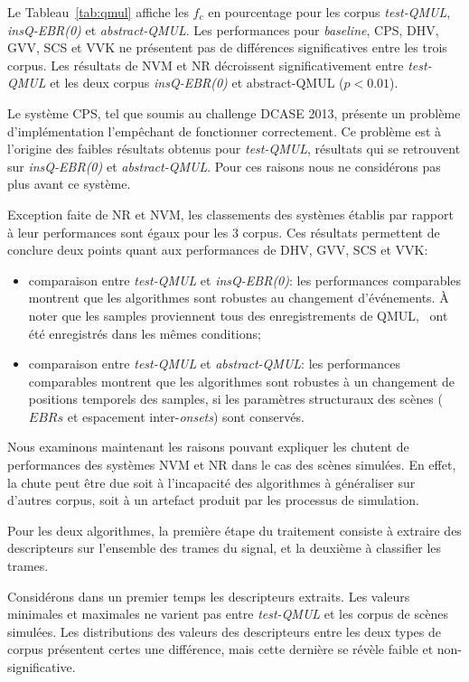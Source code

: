 Le Tableau~\ref{tab:qmul} affiche les $f_c$ en pourcentage pour les corpus \emph{test-QMUL}, \emph{insQ-EBR(0)} et \emph{abstract-QMUL}. Les performances pour \emph{baseline}, CPS, DHV, GVV, SCS et VVK ne présentent pas de différences significatives entre les trois corpus. Les résultats de NVM et NR décroissent significativement entre \emph{test-QMUL} et les deux corpus \emph{insQ-EBR(0)} et abstract-QMUL ($p<0.01$).

Le système CPS, tel que soumis au challenge DCASE 2013, présente un problème d'implémentation l'empêchant de fonctionner correctement. Ce problème est à l'origine des faibles résultats obtenus pour \emph{test-QMUL}, résultats qui se retrouvent sur \emph{insQ-EBR(0)} et \emph{abstract-QMUL}. Pour ces raisons nous ne considérons pas plus avant ce système.

Exception faite de NR et NVM, les classements des systèmes établis par rapport à leur performances sont égaux pour les 3 corpus. Ces résultats permettent de conclure deux points quant aux performances de DHV, GVV, SCS et VVK:

\begin{itemize}
\item comparaison entre \emph{test-QMUL} et \emph{insQ-EBR(0)}: les performances comparables montrent que les algorithmes sont robustes au changement d'événements. À noter que les samples proviennent tous des enregistrements de QMUL, \ie~ont été enregistrés dans les mêmes conditions;
\item comparaison entre \emph{test-QMUL} et \emph{abstract-QMUL}: les performances comparables montrent que les algorithmes sont robustes à un changement de positions temporels des samples, si les paramètres structuraux des scènes ($EBRs$ et espacement inter-\emph{onsets}) sont conservés.
\end{itemize}
  
Nous examinons maintenant les raisons pouvant expliquer les chutent de performances des systèmes NVM et NR dans le cas des scènes simulées. En effet, la chute peut être due soit à l'incapacité des algorithmes à généraliser sur d'autres corpus, soit à un artefact produit par les processus de simulation.

Pour les deux algorithmes, la première étape du traitement consiste à extraire des descripteurs sur l'ensemble des trames du signal, et la deuxième à classifier les trames.

Considérons dans un premier temps les descripteurs extraits. Les valeurs minimales et maximales ne varient pas entre \emph{test-QMUL} et les corpus de scènes simulées. Les distributions des valeurs des descripteurs entre les deux types de corpus présentent certes une différence, mais cette dernière se révèle faible et non-significative.  

